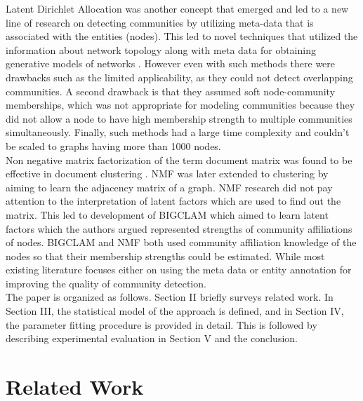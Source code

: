 Latent Dirichlet Allocation was another concept
that emerged and led to a new line of research on detecting
communities by utilizing meta-data that is associated with
the entities (nodes). This led to novel techniques that utilized the
information about network topology along with meta data
for obtaining generative models of networks \cite{aps:52} \cite{aps:51}. However even with such methods there
were drawbacks such as the limited applicability, as they
could not detect overlapping communities. A second drawback
is that they assumed soft node-community memberships, which
was not appropriate for modeling communities because they
did not allow a node to have high membership strength to
multiple communities simultaneously. Finally, such methods
had a large time complexity and couldn't be scaled to graphs
having more than 1000 nodes.\\

Non negative matrix factorization of the
term document matrix was found to be effective in document
clustering \cite{aps:56}. NMF was later extended to clustering by
aiming to learn the adjacency matrix of a graph. NMF
research did not pay attention to the interpretation of latent
factors which are used to find out the matrix. This led to
development of BIGCLAM which aimed to learn latent
factors which the authors argued represented strengths of
community affiliations of nodes. BIGCLAM and NMF both
used community affiliation knowledge of the nodes so that their membership strengths could be
estimated. While most existing literature \cite{aps:53}
focuses either on using the meta data or entity annotation for
improving the quality of community detection. \\

The paper is organized as follows. Section II briefly surveys
related work. In Section III, the statistical model of the
approach is defined, and in Section IV, the parameter fitting
procedure is provided in detail. This is followed by describing
experimental evaluation in Section V and the conclusion.\\

\section{Related Work}

